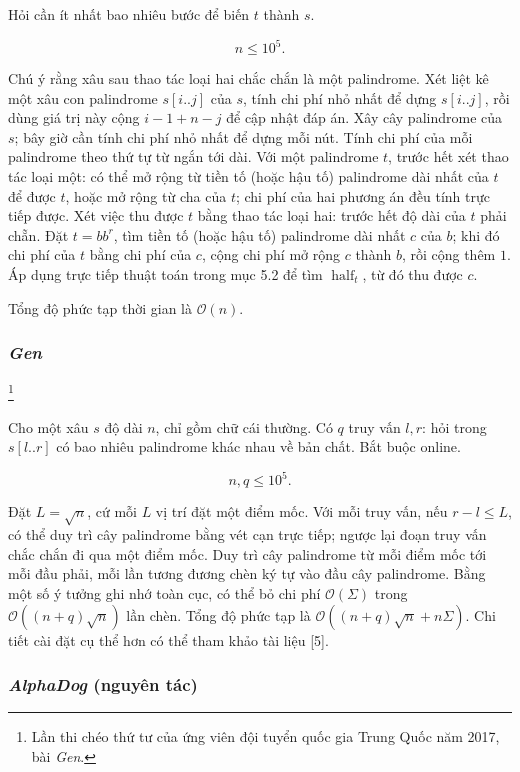 \documentclass[11pt]{article}
\newcommand{\Oh}{\mathcal{O}}
\begin{document}
Hỏi cần ít nhất bao nhiêu bước để biến \(t\) thành \(s\).

\[
n\le 10^5.
\]

Chú ý rằng xâu sau thao tác loại hai chắc chắn là một palindrome. Xét liệt kê
một xâu con palindrome \(s[i..j]\) của \(s\), tính chi phí nhỏ nhất để dựng
\(s[i..j]\), rồi dùng giá trị này cộng \(i-1+n-j\) để cập nhật đáp án. Xây cây
palindrome của \(s\); bây giờ cần tính chi phí nhỏ nhất để dựng mỗi nút. Tính
chi phí của mỗi palindrome theo thứ tự từ ngắn tới dài. Với một palindrome
\(t\), trước hết xét thao tác loại một: có thể mở rộng từ tiền tố (hoặc hậu
tố) palindrome dài nhất của \(t\) để được \(t\), hoặc mở rộng từ cha của \(t\);
chi phí của hai phương án đều tính trực tiếp được. Xét việc thu được \(t\) bằng
thao tác loại hai: trước hết độ dài của \(t\) phải chẵn. Đặt \(t=bb^r\), tìm
tiền tố (hoặc hậu tố) palindrome dài nhất \(c\) của \(b\); khi đó chi phí của
\(t\) bằng chi phí của \(c\), cộng chi phí mở rộng \(c\) thành \(b\), rồi cộng
thêm \(1\). Áp dụng trực tiếp thuật toán trong mục 5.2 để tìm
\(\operatorname{half}_t\), từ đó thu được \(c\).

Tổng độ phức tạp thời gian là \(\Oh(n)\).

\subsubsection{\emph{Gen}}
\footnote{Lần thi chéo thứ tư của ứng viên đội tuyển quốc gia Trung Quốc năm
2017, bài \emph{Gen}.}

Cho một xâu \(s\) độ dài \(n\), chỉ gồm chữ cái thường. Có \(q\) truy vấn
\(l,r\): hỏi trong \(s[l..r]\) có bao nhiêu palindrome khác nhau về bản chất.
Bắt buộc online.

\[
n,q\le 10^5.
\]

Đặt \(L=\sqrt n\), cứ mỗi \(L\) vị trí đặt một điểm mốc. Với mỗi truy vấn, nếu
\(r-l\le L\), có thể duy trì cây palindrome bằng vét cạn trực tiếp; ngược lại
đoạn truy vấn chắc chắn đi qua một điểm mốc. Duy trì cây palindrome từ mỗi
điểm mốc tới mỗi đầu phải, mỗi lần tương đương chèn ký tự vào đầu cây
palindrome. Bằng một số ý tưởng ghi nhớ toàn cục, có thể bỏ chi phí
\(\Oh(\Sigma)\) trong \(\Oh((n+q)\sqrt n)\) lần chèn. Tổng độ phức tạp là
\(\Oh((n+q)\sqrt n+n\Sigma)\). Chi tiết cài đặt cụ thể hơn có thể tham khảo
tài liệu [5].

\subsubsection{\emph{AlphaDog} (nguyên tác)}
\end{document}
